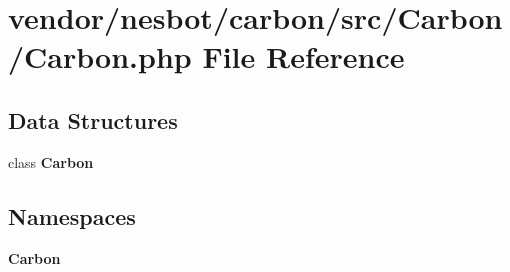 \section{vendor/nesbot/carbon/src/\+Carbon/\+Carbon.php File Reference}
\label{_carbon_8php}
\subsection*{Data Structures}
\begin{DoxyCompactItemize}
\item 
class {\bf Carbon}
\end{DoxyCompactItemize}
\subsection*{Namespaces}
\begin{DoxyCompactItemize}
\item 
 {\bf Carbon}
\end{DoxyCompactItemize}
